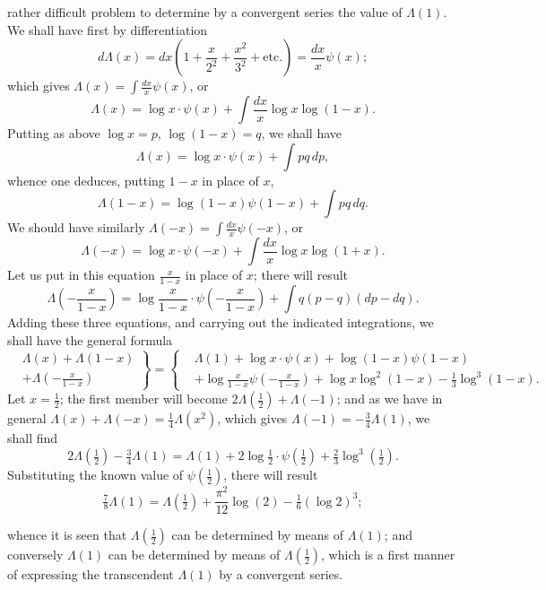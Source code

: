 \documentclass{article}
\begin{document}
rather difficult problem to determine by a convergent series the value of $\Lambda(1)$. We shall have first by differentiation
\[ d\Lambda(x)=dx\left(1+\frac{x}{2^{2}}+\frac{x^{2}}{3^{2}}+\text{etc.}\right)=\frac{dx}{x}\psi(x); \]
which gives $\Lambda(x)=\displaystyle\int\frac{dx}{x}\psi(x)$, or
\[ \Lambda(x)=\log x\cdot\psi(x)+\int\frac{dx}{x}\log x\log(1-x). \]
Putting as above $\log x=p$, $\log(1-x)=q$, we shall have
\[ \Lambda(x)=\log x\cdot\psi(x)+\int pq\,dp, \]
whence one deduces, putting $1-x$ in place of $x$,
\[ \Lambda(1-x)=\log(1-x)\psi(1-x)+\int pq\,dq. \]
We should have similarly $\Lambda(-x)=\displaystyle\int\frac{dx}{x}\psi(-x)$, or
\[ \Lambda(-x)=\log x\cdot\psi(-x)+\int\frac{dx}{x}\log x\log(1+x). \]
Let us put in this equation $\frac{x}{1-x}$ in place of $x$; there will result
\[ \Lambda\left(-\frac{x}{1-x}\right)=\log\frac{x}{1-x}\cdot\psi\left(-\frac{x}{1-x}\right)+\int q(p-q)(dp-dq). \]
Adding these three equations, and carrying out the indicated integrations, we shall have the general formula
\[ \left.\begin{aligned} &\Lambda(x)+\Lambda(1-x)\\ &+\Lambda\left(-\frac{x}{1-x}\right) \end{aligned}\right\}=\left\{\begin{aligned} &\Lambda(1)+\log x\cdot\psi(x)+\log(1-x)\psi(1-x)\\ &+\log\frac{x}{1-x}\psi\left(-\frac{x}{1-x}\right)+\log x\log^{2}(1-x)-\tfrac{1}{3}\log^{3}(1-x). \end{aligned}\right. \]
Let $x=\frac{1}{2}$; the first member will become $2\Lambda\left(\frac{1}{2}\right)+\Lambda(-1)$; and as we have in general $\Lambda(x)+\Lambda(-x)=\frac{1}{4}\Lambda(x^{2})$, which gives $\Lambda(-1)=-\frac{3}{4}\Lambda(1)$, we shall find
\[ 2\Lambda\left(\tfrac{1}{2}\right)-\tfrac{3}{4}\Lambda(1)=\Lambda(1)+2\log\tfrac{1}{2}\cdot\psi\left(\tfrac{1}{2}\right)+\tfrac{2}{3}\log^{3}\left(\tfrac{1}{2}\right). \]
Substituting the known value of $\psi\left(\frac{1}{2}\right)$, there will result
\[ \tfrac{7}{8}\Lambda(1)=\Lambda\left(\tfrac{1}{2}\right)+\frac{\pi^{2}}{12}\log(2)-\tfrac{1}{6}(\log 2)^{3}; \]

whence it is seen that $\Lambda\left(\frac{1}{2}\right)$ can be determined by means of $\Lambda(1)$; and conversely $\Lambda(1)$ can be determined by means of $\Lambda\left(\frac{1}{2}\right)$, which is a first manner of expressing the transcendent $\Lambda(1)$ by a convergent series.
\end{document}
